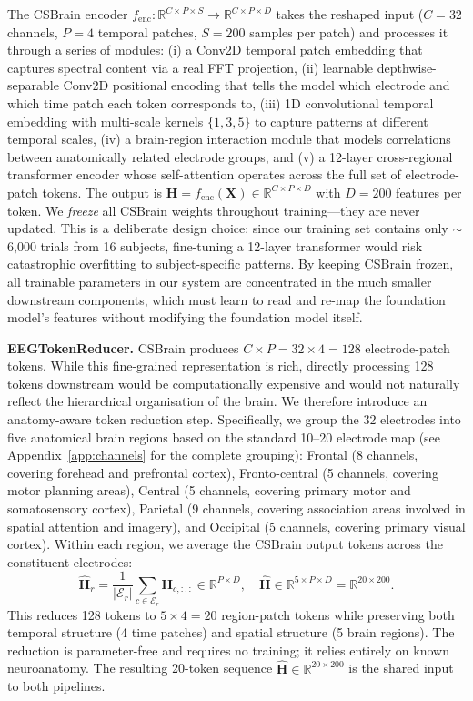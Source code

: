 \documentclass{article}
\begin{document}
The CSBrain encoder $f_\mathrm{enc}: \mathbb{R}^{C \times P \times S} \to \mathbb{R}^{C \times P \times D}$ takes the reshaped input ($C=32$ channels, $P=4$ temporal patches, $S=200$ samples per patch) and processes it through a series of modules: (i) a Conv2D temporal patch embedding that captures spectral content via a real FFT projection, (ii) learnable depthwise-separable Conv2D positional encoding that tells the model which electrode and which time patch each token corresponds to, (iii) 1D convolutional temporal embedding with multi-scale kernels $\{1, 3, 5\}$ to capture patterns at different temporal scales, (iv) a brain-region interaction module that models correlations between anatomically related electrode groups, and (v) a 12-layer cross-regional transformer encoder whose self-attention operates across the full set of electrode-patch tokens. The output is $\mathbf{H} = f_\mathrm{enc}(\mathbf{X}) \in \mathbb{R}^{C \times P \times D}$ with $D = 200$ features per token. We \emph{freeze} all CSBrain weights throughout training---they are never updated. This is a deliberate design choice: since our training set contains only $\sim$6,000 trials from 16 subjects, fine-tuning a 12-layer transformer would risk catastrophic overfitting to subject-specific patterns. By keeping CSBrain frozen, all trainable parameters in our system are concentrated in the much smaller downstream components, which must learn to read and re-map the foundation model's features without modifying the foundation model itself.

\textbf{EEGTokenReducer.}
CSBrain produces $C \times P = 32 \times 4 = 128$ electrode-patch tokens. While this fine-grained representation is rich, directly processing 128 tokens downstream would be computationally expensive and would not naturally reflect the hierarchical organisation of the brain. We therefore introduce an anatomy-aware token reduction step. Specifically, we group the 32 electrodes into five anatomical brain regions based on the standard 10--20 electrode map (see Appendix~\ref{app:channels} for the complete grouping): Frontal (8 channels, covering forehead and prefrontal cortex), Fronto-central (5 channels, covering motor planning areas), Central (5 channels, covering primary motor and somatosensory cortex), Parietal (9 channels, covering association areas involved in spatial attention and imagery), and Occipital (5 channels, covering primary visual cortex). Within each region, we average the CSBrain output tokens across the constituent electrodes:
\begin{equation}
  \hat{\mathbf{H}}_r = \frac{1}{|\mathcal{E}_r|} \sum_{c \in \mathcal{E}_r} \mathbf{H}_{c,:,:} \in \mathbb{R}^{P \times D},
  \quad \hat{\mathbf{H}} \in \mathbb{R}^{5 \times P \times D} = \mathbb{R}^{20 \times 200}.
\end{equation}
This reduces 128 tokens to $5 \times 4 = 20$ region-patch tokens while preserving both temporal structure (4 time patches) and spatial structure (5 brain regions). The reduction is parameter-free and requires no training; it relies entirely on known neuroanatomy. The resulting 20-token sequence $\hat{\mathbf{H}} \in \mathbb{R}^{20 \times 200}$ is the shared input to both pipelines.
\end{document}
